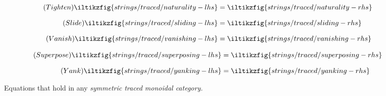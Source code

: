 \begin{figure}
    \centering
    \begin{minipage}{0.52\textwidth}
        \begin{align*}
            \tag{\(\mathsf{Tighten}\)}
            \iltikzfig{strings/traced/naturality-lhs}
            &=
            \iltikzfig{strings/traced/naturality-rhs}
            \label{eq:tightening}
            \\[0.75em]
            \tag{\(\mathsf{Slide}\)}
            \iltikzfig{strings/traced/sliding-lhs}
            &=
            \iltikzfig{strings/traced/sliding-rhs}
            \label{eq:sliding}
            \\[0.75em]
            \tag{\(\mathsf{Vanish}\)}
            \iltikzfig{strings/traced/vanishing-lhs}
            &=
            \iltikzfig{strings/traced/vanishing-rhs}
            \label{eq:vanishing}
        \end{align*}
    \end{minipage}
    \hspace{-1em}
    \begin{minipage}{0.455\textwidth}
        \begin{align*}
            \tag{\(\mathsf{Superpose}\)}
            \iltikzfig{strings/traced/superposing-lhs}
            &=
            \iltikzfig{strings/traced/superposing-rhs}
            \label{eq:superposing}
            \\[0.75em]
            \tag{\(\mathsf{Yank}\)}
            \iltikzfig{strings/traced/yanking-lhs}
            &=
            \iltikzfig{strings/traced/yanking-rhs}
            \label{eq:yanking}
        \end{align*}
    \end{minipage}
    \caption{
        Equations that hold in any \emph{symmetric traced monoidal category.}
    }
    \label{fig:stmc-axioms}
\end{figure}